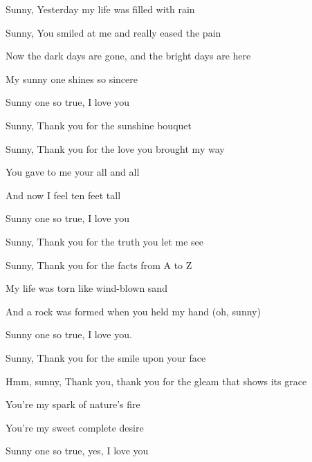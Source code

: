 

\zs
Sunny, Yesterday my life was filled with rain

Sunny, You smiled at me and really eased the pain

Now the dark days are gone, and the bright days are here

My sunny one shines so sincere

Sunny one so true, I love you
\ks

\zs
Sunny, Thank you for the sunshine bouquet

Sunny, Thank you for the love you brought my way

You gave to me your all and all

And now I feel ten feet tall

Sunny one so true, I love you
\ks

\zs
Sunny, Thank you for the truth you let me see

Sunny, Thank you for the facts from A to Z

My life was torn like wind-blown sand

And a rock was formed when you held my hand (oh, sunny)

Sunny one so true, I love you.
\ks

\zs
Sunny, Thank you for the smile upon your face

Hmm, sunny, Thank you, thank you for the gleam that shows its grace

You're my spark of nature's fire

You're my sweet complete desire

Sunny one so true, yes, I love you
\ks

\kp
